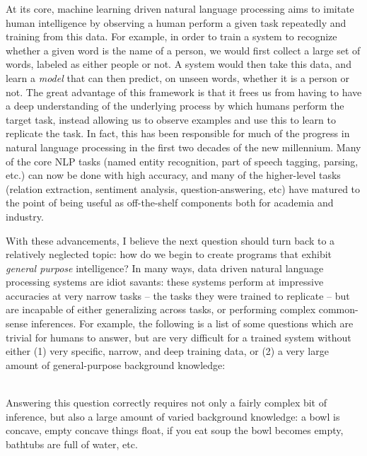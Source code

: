 
%
%
At its core, machine learning driven natural language processing aims to imitate human intelligence by
  observing a human perform a given task repeatedly and training from this data.
For example, in order to train a system to recognize whether a given word is the name of a person,
  we would first collect a large set of words, labeled as either people or not.
A system would then take this data, and learn a \textit{model} that can then predict, on unseen
  words, whether it is a person or not.
The great advantage of this framework is that it frees us from having to have a deep understanding of
  the underlying process by which humans perform the target task, instead allowing us to observe
  examples and use this to learn to replicate the task.
In fact, this has been responsible for much of the progress in natural language processing in
  the first two decades of the new millennium.
Many of the core NLP tasks (named entity recognition, part of speech tagging, parsing, etc.)
  can now be done with high accuracy,
  and many of the higher-level tasks (relation extraction, sentiment analysis, question-answering, etc)
  have matured to the point of being useful as off-the-shelf components both for academia and industry.

With these advancements, I believe the next question should turn back to a relatively neglected
  topic: how do we begin to create programs that exhibit \textit{general purpose} intelligence?
In many ways, data driven natural language processing systems are idiot savants:
  these systems perform at impressive accuracies at very narrow tasks -- the tasks they were trained
  to replicate -- but are incapable of either generalizing across tasks, or performing complex
  common-sense inferences.
For example, the following is a list of some questions which are trivial for humans to answer, 
  but are very difficult
  for a trained system without either (1) very specific, narrow, and deep training data, or (2) a very large
  amount of general-purpose background knowledge:

\begin{displayquote}
   \\
  Answering this question correctly requires not only a fairly complex bit of inference, but also
    a large amount of varied background knowledge: a bowl is concave, empty concave things float,
    if you eat soup the bowl becomes empty, bathtubs are full of water, etc.
\end{displayquote}

